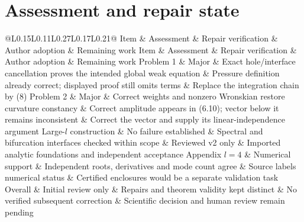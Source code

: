 \documentclass[10pt]{article}
\begin{document}
\section*{Assessment and repair state}
@L0.15L0.11L0.27L0.17L0.21@ Item \& Assessment \& Repair verification \& Author adoption \& Remaining work
Item \& Assessment \& Repair verification \& Author adoption \& Remaining work
Problem 1 \& Major \& Exact hole/interface cancellation proves the intended global weak equation \& Pressure definition already correct; displayed proof still omits terms \& Replace the integration chain by (8)
Problem 2 \& Major \& Correct weights and nonzero Wronskian restore curvature constancy \& Correct amplitude appears in (6.10); vector below it remains inconsistent \& Correct the vector and supply its linear-independence argument
Large-\(l\) construction \& No failure established \& Spectral and bifurcation interfaces checked within scope \& Reviewed v2 only \& Imported analytic foundations and independent acceptance
Appendix \(l=4\) \& Numerical support \& Independent roots, derivatives and mode count agree \& Source labels numerical status \& Certified enclosures would be a separate validation task
Overall \& Initial review only \& Repairs and theorem validity kept distinct \& No verified subsequent correction \& Scientific decision and human review remain pending\par
\end{document}

